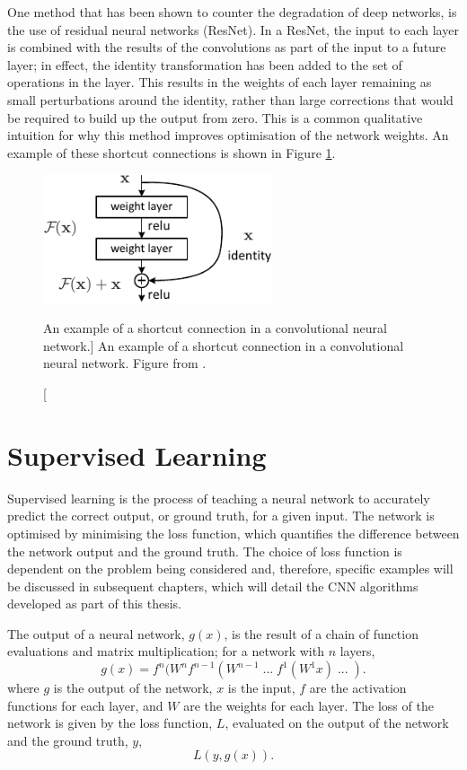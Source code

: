 One method that has been shown to counter the degradation of deep networks, 
is the use of residual neural networks (ResNet). In a ResNet, the input to 
each layer is combined with the results of the convolutions as part of the 
input to a future layer; in effect, the identity transformation has been added
to the set of operations in the layer. This results in the weights of each layer
remaining as small perturbations around the identity, rather than large
corrections that would be required to build up the output from zero. This is a 
common qualitative intuition for why this method improves optimisation of the 
network weights. An example of these shortcut connections is shown in Figure 
\ref{fig:short_connect}\cite{He_2016_CVPR}. 
\begin{figure}
	\centering
	\includegraphics[width = 0.6\textwidth]{figures/short_connect.pdf}
	\caption
	[An example of a shortcut connection in a convolutional neural network.]
	{An example of a shortcut connection in a convolutional neural network.
	Figure from \cite{He_2016_CVPR}.}
	\label{fig:short_connect}
\end{figure}

\section{Supervised Learning}
Supervised learning is the process of teaching a neural network to accurately
predict the correct output, or ground truth, for a given input. The network is 
optimised by minimising the loss function, which quantifies the difference 
between the network output and the ground truth. The choice of loss function 
is dependent on the problem being considered and, therefore, specific examples 
will be discussed in subsequent chapters, which will detail the CNN algorithms 
developed as part of this thesis.

The output of a neural network, $g(x)$, is the result of a chain of function 
evaluations and matrix multiplication; for a network with $n$ layers,
\begin{equation*}
	g(x) = f^n(W^n f^{n-1}(W^{n-1} \;...\; f^1(W^1 x) \;...\; ).
\end{equation*}
where $g$ is the output of the network, $x$ is the input, $f$ are the 
activation functions for each layer, and $W$ are the weights for each layer. 
The loss of the network is given by the loss function, $L$, evaluated on the 
output of the network and the ground truth, $y$,
\begin{equation*}
	L(y, g(x)).
\end{equation*}

